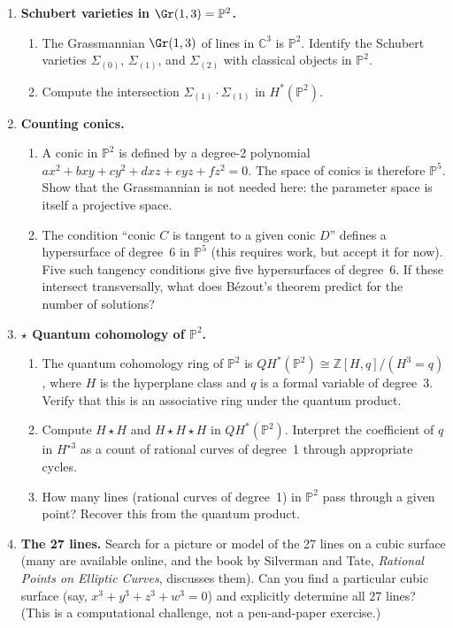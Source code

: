 \begin{enumerate}
    \item \textbf{Schubert varieties in $\Gr(1, 3) = \mathbb{P}^2$.}
    \begin{enumerate}
        \item The Grassmannian $\Gr(1, 3)$ of lines in $\mathbb{C}^3$ is $\mathbb{P}^2$. Identify the Schubert varieties $\Sigma_{(0)}$, $\Sigma_{(1)}$, and $\Sigma_{(2)}$ with classical objects in $\mathbb{P}^2$.
        \item Compute the intersection $\Sigma_{(1)} \cdot \Sigma_{(1)}$ in $H^*(\mathbb{P}^2)$.
    \end{enumerate}

    \item \textbf{Counting conics.}
    \begin{enumerate}
        \item A conic in $\mathbb{P}^2$ is defined by a degree-2 polynomial $ax^2 + bxy + cy^2 + dxz + eyz + fz^2 = 0$. The space of conics is therefore $\mathbb{P}^5$. Show that the Grassmannian is not needed here: the parameter space is itself a projective space.
        \item The condition ``conic $C$ is tangent to a given conic $D$'' defines a hypersurface of degree~6 in $\mathbb{P}^5$ (this requires work, but accept it for now). Five such tangency conditions give five hypersurfaces of degree~6. If these intersect transversally, what does B\'ezout's theorem predict for the number of solutions?
    \end{enumerate}

    \item \textbf{$\star$ Quantum cohomology of $\mathbb{P}^2$.}
    \begin{enumerate}
        \item The quantum cohomology ring of $\mathbb{P}^2$ is $QH^*(\mathbb{P}^2) \cong \mathbb{Z}[H, q] / (H^3 = q)$, where $H$ is the hyperplane class and $q$ is a formal variable of degree~3. Verify that this is an associative ring under the quantum product.
        \item Compute $H \star H$ and $H \star H \star H$ in $QH^*(\mathbb{P}^2)$. Interpret the coefficient of $q$ in $H^{\star 3}$ as a count of rational curves of degree~1 through appropriate cycles.
        \item How many lines (rational curves of degree~1) in $\mathbb{P}^2$ pass through a given point? Recover this from the quantum product.
    \end{enumerate}

    \item[$\star$] \textbf{The 27 lines.} Search for a picture or model of the 27 lines on a cubic surface (many are available online, and the book by Silverman and Tate, \emph{Rational Points on Elliptic Curves}, discusses them). Can you find a particular cubic surface (say, $x^3 + y^3 + z^3 + w^3 = 0$) and explicitly determine all 27 lines? (This is a computational challenge, not a pen-and-paper exercise.)

\end{enumerate}

